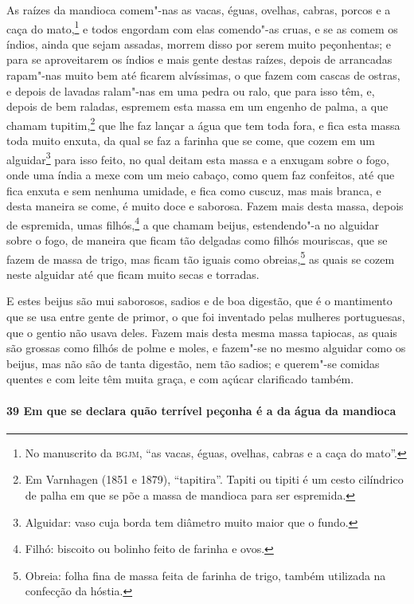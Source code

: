 As raízes da mandioca comem"-nas as vacas, éguas, ovelhas, cabras, porcos e a caça do
mato,\footnote{ No manuscrito da \textsc{bgjm}, ``as vacas, éguas, ovelhas, cabras e a
caça do mato''.} e todos engordam com elas comendo"-as cruas, e se as comem os índios,
ainda que sejam assadas, morrem disso por serem muito peçonhentas; e para se aproveitarem
os índios e mais gente destas raízes, depois de arrancadas rapam"-nas muito bem até ficarem
alvíssimas, o que fazem com cascas de ostras, e depois de lavadas ralam"-nas em uma pedra
ou ralo, que para isso têm, e, depois de bem raladas, espremem esta massa em um engenho de
palma, a que chamam tupitim,\footnote{ Em Varnhagen (1851 e 1879), ``tapitira''. Tapiti ou
tipiti é um cesto cilíndrico de palha em que se põe a massa de mandioca para ser
espremida.} que lhe faz lançar a água que tem toda fora, e fica esta massa toda muito
enxuta, da qual se faz a farinha que se come, que cozem em um alguidar\footnote{ Alguidar:
vaso cuja borda tem diâmetro muito maior que o fundo.} para isso feito, no qual deitam
esta massa e a enxugam sobre o fogo, onde uma índia a mexe com um meio cabaço, como quem
faz confeitos, até que fica enxuta e sem nenhuma umidade, e fica como cuscuz, mas mais
branca, e desta maneira se come, é muito doce e saborosa. Fazem mais desta massa, depois
de espremida, umas filhós,\footnote{ Filhó: biscoito ou bolinho feito de farinha e ovos.}
a que chamam beijus, estendendo"-a no alguidar sobre o fogo, de maneira que ficam tão
delgadas como filhós mouriscas, que se fazem de massa de trigo, mas ficam tão iguais como
obreias,\footnote{ Obreia: folha fina de massa feita de farinha de trigo, também utilizada
na confecção da hóstia.} as quais se cozem neste alguidar até que ficam muito secas e
torradas.

E estes beijus são mui saborosos, sadios e de boa digestão, que é o mantimento que se usa
entre gente de primor, o que foi inventado pelas mulheres portuguesas, que o gentio não
usava deles. Fazem mais desta mesma massa tapiocas, as quais são grossas como filhós de
polme e moles, e fazem"-se no mesmo alguidar como os beijus, mas não são de tanta digestão,
nem tão sadios; e querem"-se comidas quentes e com leite têm muita graça, e com açúcar
clarificado também.

\paragraph{39 Em que se declara quão terrível peçonha é a da água da mandioca}

